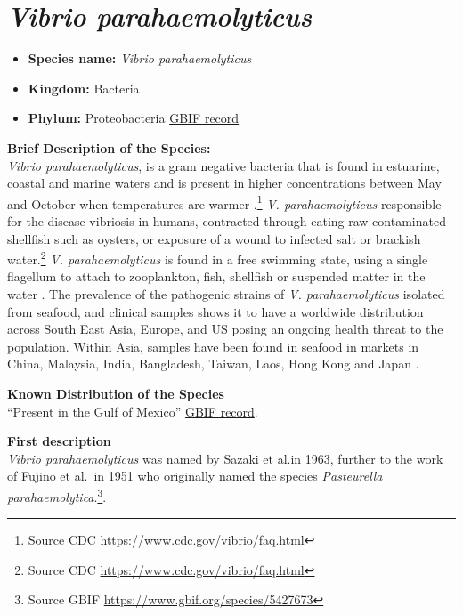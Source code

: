 \documentclass[]{book}
\providecommand{\tightlist}{%
  \setlength{\itemsep}{0pt}\setlength{\parskip}{0pt}}
\let\rmarkdownfootnote\footnote%
\def\footnote{\protect\rmarkdownfootnote}
\theoremstyle{definition}
\theoremstyle{definition}
\theoremstyle{definition}
\theoremstyle{remark}
\begin{document}
\hypertarget{vibrio-parahaemolyticus}{%
\section{\texorpdfstring{\emph{Vibrio
parahaemolyticus}}{Vibrio parahaemolyticus}}\label{vibrio-parahaemolyticus}}

\begin{itemize}
\tightlist
\item
  \textbf{Species name:} \emph{Vibrio parahaemolyticus}
\item
  \textbf{Kingdom:} Bacteria\\
\item
  \textbf{Phylum:} Proteobacteria
  \href{https://www.gbif.org/species/5427673}{GBIF record}
\end{itemize}

\textbf{Brief Description of the Species:}\\
\emph{Vibrio parahaemolyticus}, is a gram negative bacteria that is
found in estuarine, coastal and marine waters and is present in higher
concentrations between May and October when temperatures are warmer
\citep{Letchumanan_2014}.\footnote{Source CDC
  \url{https://www.cdc.gov/vibrio/faq.html}} \emph{V. parahaemolyticus}
responsible for the disease vibriosis in humans, contracted through
eating raw contaminated shellfish such as oysters, or exposure of a
wound to infected salt or brackish water.\footnote{Source CDC
  \url{https://www.cdc.gov/vibrio/faq.html}} \emph{V. parahaemolyticus}
is found in a free swimming state, using a single flagellum to attach to
zooplankton, fish, shellfish or suspended matter in the water
\citep{Letchumanan_2014}. The prevalence of the pathogenic strains of
\emph{V. parahaemolyticus} isolated from seafood, and clinical samples
shows it to have a worldwide distribution across South East Asia,
Europe, and US posing an ongoing health threat to the population. Within
Asia, samples have been found in seafood in markets in China, Malaysia,
India, Bangladesh, Taiwan, Laos, Hong Kong and Japan
\citep{Letchumanan_2014}.

\textbf{Known Distribution of the Species}\\
``Present in the Gulf of Mexico''
\href{http://www.gbif.org/species/5427673}{GBIF record}.

\textbf{First description}\\
\emph{Vibrio parahaemolyticus} was named by Sazaki et al.in 1963,
further to the work of Fujino et al.~in 1951 who originally named the
species \emph{Pasteurella parahaemolytica}.\footnote{Source GBIF
  \url{https://www.gbif.org/species/5427673}}.
\end{document}
